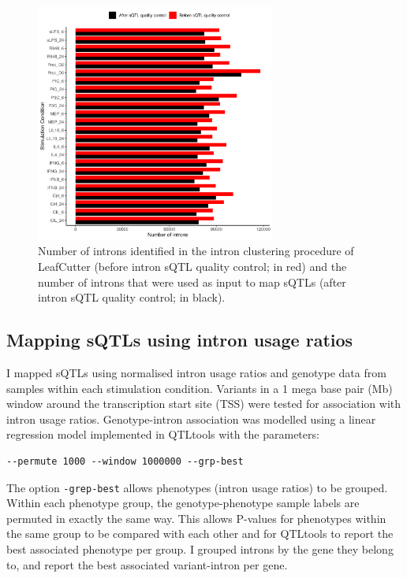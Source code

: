 \begin{figure}[H]
  \centering
  \includegraphics[width=0.7\textwidth]{qc_introns_num}
  \caption[Number of introns before and after intron quality control]{Number of introns identified in the intron clustering procedure of
  LeafCutter (before intron sQTL quality control; in red) and the number of introns that were
  used as input to map sQTLs (after intron sQTL quality control; in black).}
  \label{fig:qc_introns_num}   
\end{figure}

\subsection{Mapping sQTLs using intron usage ratios}
I mapped sQTLs using normalised intron usage ratios and genotype data from samples within each stimulation condition. Variants in a 1 mega base pair (Mb) window around the transcription start site (TSS) were tested for association with intron usage ratios. Genotype-intron association was modelled using a linear regression model implemented in QTLtools \cite{Delaneau2017-dg} with the parameters:
\begin{verbatim}
--permute 1000 --window 1000000 --grp-best
\end{verbatim}
The option \Verb+-grep-best+ allows phenotypes (intron usage ratios) to be grouped. Within each phenotype group, the genotype-phenotype sample labels are permuted in exactly the same way. This allows P-values for phenotypes within the same group to be compared with each other and for QTLtools to report the best associated phenotype per group. I grouped introns by the gene they belong to, and report the best associated variant-intron per gene.

